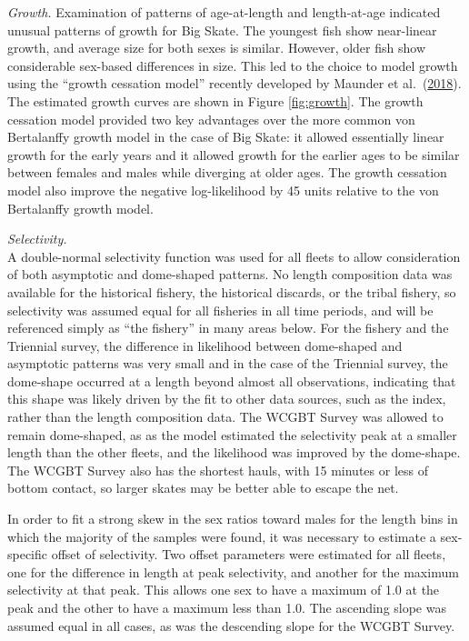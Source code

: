 \documentclass[12pt,]{article}
\begin{document}
\emph{Growth.} Examination of patterns of age-at-length and
length-at-age indicated unusual patterns of growth for Big Skate. The
youngest fish show near-linear growth, and average size for both sexes
is similar. However, older fish show considerable sex-based differences
in size. This led to the choice to model growth using the ``growth
cessation model'' recently developed by Maunder et
al.~(\protect\hyperlink{ref-maunder2018growth}{2018}). The estimated
growth curves are shown in Figure \ref{fig:growth}. The growth cessation
model provided two key advantages over the more common von Bertalanffy
growth model in the case of Big Skate: it allowed essentially linear
growth for the early years and it allowed growth for the earlier ages to
be similar between females and males while diverging at older ages. The
growth cessation model also improve the negative log-likelihood by 45
units relative to the von Bertalanffy growth model.

\emph{Selectivity.}\\
A double-normal selectivity function was used for all fleets to allow
consideration of both asymptotic and dome-shaped patterns. No length
composition data was available for the historical fishery, the
historical discards, or the tribal fishery, so selectivity was assumed
equal for all fisheries in all time periods, and will be referenced
simply as ``the fishery'' in many areas below. For the fishery and the
Triennial survey, the difference in likelihood between dome-shaped and
asymptotic patterns was very small and in the case of the Triennial
survey, the dome-shape occurred at a length beyond almost all
observations, indicating that this shape was likely driven by the fit to
other data sources, such as the index, rather than the length
composition data. The WCGBT Survey was allowed to remain dome-shaped, as
as the model estimated the selectivity peak at a smaller length than the
other fleets, and the likelihood was improved by the dome-shape. The
WCGBT Survey also has the shortest hauls, with 15 minutes or less of
bottom contact, so larger skates may be better able to escape the net.

In order to fit a strong skew in the sex ratios toward males for the
length bins in which the majority of the samples were found, it was
necessary to estimate a sex-specific offset of selectivity. Two offset
parameters were estimated for all fleets, one for the difference in
length at peak selectivity, and another for the maximum selectivity at
that peak. This allows one sex to have a maximum of 1.0 at the peak and
the other to have a maximum less than 1.0. The ascending slope was
assumed equal in all cases, as was the descending slope for the WCGBT
Survey.
\end{document}
